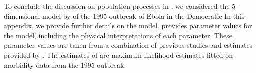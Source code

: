 To conclude the discussion on population processes in , we considered the 5-dimensional model by \citep{LegrandEtAl_2007_UnderstandingDynamicsEbola} of the 1995 outbreak of Ebola in the Democratic
In this appendix, we provide further details on the model.
 provides parameter values for the model, including the physical interpretations of each parameter.
These parameter values are taken from a combination of previous studies \citep{DowellEtAl_1999_TransmissionEbolaHemorrhagic,KhanEtAl_1999_ReemergenceEbolaHemorrhagic,BwakaEtAl_1999_EbolaHemorrhagicFever,NdambiEtAl_1999_EpidemiologicClinicalAspects} and estimates provided by \citet{LegrandEtAl_2007_UnderstandingDynamicsEbola}.
The estimates of \citet{LegrandEtAl_2007_UnderstandingDynamicsEbola} are maximum likelihood estimates fitted on morbidity data from the 1995 outbreak.

